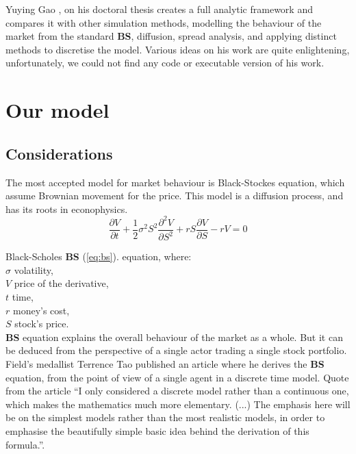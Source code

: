 \documentclass[twoside]{article}
\begin{document}
\begin{multicols}{2}
Yuying Gao \cite{yuying2005}, on his doctoral thesis creates a full analytic framework and compares it with other simulation methods, modelling the behaviour of the market from the standard {\bf BS}, diffusion, spread analysis, and applying distinct methods to discretise the model. Various ideas on his work are quite enlightening, unfortunately, we could not find any code or executable version of his work.\\

\section{Our model}


\subsection{Considerations}

The most accepted model for market behaviour is Black-Stockes equation, which assume Brownian movement for the price. This model is a diffusion process, and has its roots in econophysics.\\

\begin{equation}
\label{eq:bs}
  \frac{\partial V}{\partial t}+\frac{1}{2}\sigma^2S^2\frac{\partial^2 V}{\partial S^2}+rS\frac{\partial V}{\partial S} - rV =0 
\end{equation}

Black-Scholes {\bf BS} (\ref{eq:bs}). equation, where:\\
$\sigma$ volatility,\\
$V$ price of the derivative,\\ 
$t$ time,\\ 
$r$ money's cost,\\
$S$ stock's price.\\



{\bf BS} equation explains the overall behaviour of the market as a whole. But it can be deduced from the perspective of a single actor trading a single stock portfolio. Field's medallist Terrence Tao \cite{tao2008} published an article where he derives the {\bf BS} equation, from the point of view of a single agent in a discrete time model. Quote from the article ``I only considered a discrete model rather than a continuous one, which makes the mathematics much more elementary. (...) The emphasis here will be on the simplest models rather than the most realistic models, in order to emphasise the beautifully simple basic idea behind the derivation of this formula.''. \\


\end{multicols}
\end{document}
